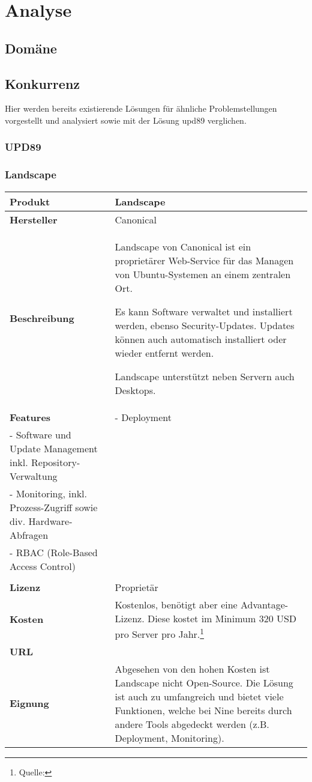 \chapter{Analyse}

\section{Domäne}

\section{Konkurrenz} \label{sec:analysis:competition}

Hier werden bereits existierende Lösungen für ähnliche Problemstellungen vorgestellt und analysiert sowie mit der Lösung \gls{upd89} verglichen.

\subsection{UPD89}

\newcommand{\competitor}[8]{
	\begin{tabularx}{\linewidth}{lX}
		\toprule
		\textbf{Produkt} & #1\\
		\midrule
		\textbf{Hersteller} & #2\\
		\textbf{Beschreibung} & #3\\
		\textbf{Features} & #4\\
    \textbf{Lizenz} & #5\\
		\textbf{Kosten} & #6\\
    \textbf{URL} & #7\\
    \textbf{Eignung} & #8\\
		\bottomrule
	\end{tabularx}
}

\subsection{Landscape}

\competitor{Landscape}
{Canonical}
{Landscape von Canonical ist ein proprietärer Web-Service für das Managen von Ubuntu-Systemen an einem zentralen Ort.

Es kann Software verwaltet und installiert werden, ebenso Security-Updates. Updates können auch automatisch installiert oder wieder entfernt werden.

Landscape unterstützt neben Servern auch Desktops.}
{
- Deployment\\
- Software und Update Management inkl. Repository-Verwaltung\\
- Monitoring, inkl. Prozess-Zugriff sowie div. Hardware-Abfragen\\
- RBAC (Role-Based Access Control)\\
}
{Proprietär}
{Kostenlos, benötigt aber eine Advantage-Lizenz. Diese kostet im Minimum 320 USD pro Server pro Jahr.\footnote{Quelle: \purl{http://www.ubuntu.com/management/ubuntu-advantage}}}
{\purl{https://landscape.canonical.com/}}
{Abgesehen von den hohen Kosten ist Landscape nicht Open-Source. Die Lösung ist auch zu umfangreich und bietet viele Funktionen, welche bei Nine bereits durch andere Tools abgedeckt werden (z.B. Deployment, Monitoring).}

